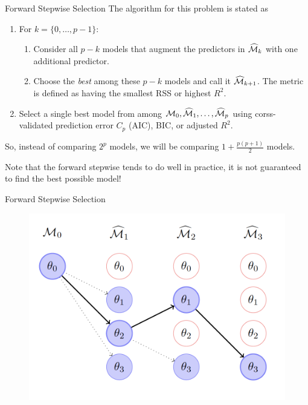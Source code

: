 \documentclass{beamer}
\begin{document}
\begin{frame}{Forward Stepwise Selection}
	The algorithm for this problem is stated as
	\begin{enumerate}
		\item For $k=\{0,\ldots, p-1\}$:
		\begin{enumerate}
			\item Consider all $p-k$ models that augment the predictors in $\widehat{\cal M}_k$ with one additional predictor.
			\item Choose the {\it best} among these $p-k$ models and call it $\widehat{\cal M}_{k+1}$. The metric is defined as having the smallest RSS or highest $R^2$.
		\end{enumerate}
	\item Select a single best model from among ${\cal M}_0,\widehat{\cal M}_1,\ldots, \widehat{\cal M}_p$ using corss-validated prediction error $C_p$ (AIC), BIC, or adjusted $R^2$.
		\end{enumerate}
	So, instead of comparing $2^p$ models, we will be comparing $1 + \frac{p(p+1)}{2}$ models. 
	
	Note that the forward stepwise tends to do well in practice, it is not guaranteed to find the best possible model!

\end{frame}

\begin{frame}{Forward Stepwise Selection}
	
	 \begin{figure}[h]
		\centering
		\includegraphics[scale=0.5]{../../Figures/fig_forward.png}
	\end{figure}
\end{frame}
\end{document}
